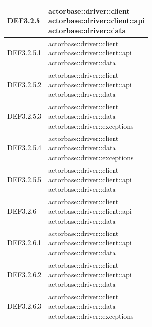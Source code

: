 \documentclass{scalatekids-article}
\begin{document}
\begin{longtable}[H]{|p{6cm}|p{11cm}|}
\hline
DEF3.2.5 & \multiLineCell[t]{actorbase::driver::client\\actorbase::driver::client::api\\actorbase::driver::data\\}\\
\hline
DEF3.2.5.1 & \multiLineCell[t]{actorbase::driver::client\\actorbase::driver::client::api\\actorbase::driver::data\\}\\
\hline
DEF3.2.5.2 & \multiLineCell[t]{actorbase::driver::client\\actorbase::driver::client::api\\actorbase::driver::data\\}\\
\hline
DEF3.2.5.3 & \multiLineCell[t]{actorbase::driver::client\\actorbase::driver::data\\actorbase::driver::exceptions\\}\\
\hline
DEF3.2.5.4 & \multiLineCell[t]{actorbase::driver::client\\actorbase::driver::data\\actorbase::driver::exceptions\\}\\
\hline
DEF3.2.5.5 & \multiLineCell[t]{actorbase::driver::client\\actorbase::driver::client::api\\actorbase::driver::data\\}\\
\hline
DEF3.2.6 & \multiLineCell[t]{actorbase::driver::client\\actorbase::driver::client::api\\actorbase::driver::data\\}\\
\hline
DEF3.2.6.1 & \multiLineCell[t]{actorbase::driver::client\\actorbase::driver::client::api\\actorbase::driver::data\\}\\
\hline
DEF3.2.6.2 & \multiLineCell[t]{actorbase::driver::client\\actorbase::driver::client::api\\actorbase::driver::data\\}\\
\hline
DEF3.2.6.3 & \multiLineCell[t]{actorbase::driver::client\\actorbase::driver::data\\actorbase::driver::exceptions\\}\\

\end{longtable}
\end{document}
